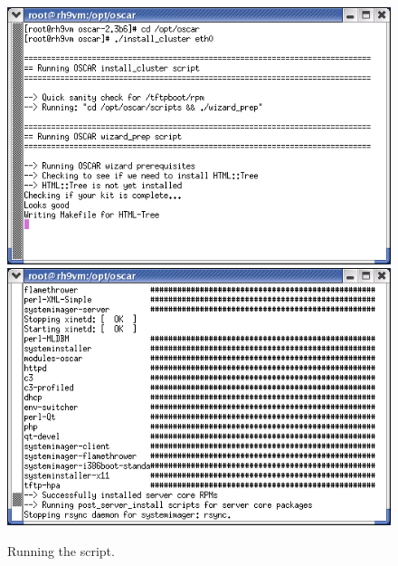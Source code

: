 \begin{figure}[!ht]
  \begin{center}
    \centerline{
      \includegraphics[scale=\imgscale]{figs/1a_sbs-install-oscar}
      \hspace{\imghskip}
      \includegraphics[scale=\imgscale]{figs/1b_sbs-install-oscar2}
      }
    \caption{Running the  script.}
    \label{fig:sbs-install-oscar}
  \end{center}
\end{figure}

